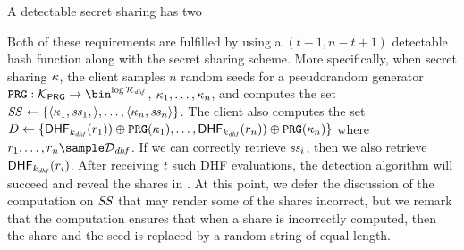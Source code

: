 \iffalse 
A detectable secret sharing has two

Both of these requirements are fulfilled by using a $(t-1, n - t + 1)$ detectable hash function along with the secret sharing scheme. More specifically, when secret sharing $\kappa$, the client samples $n$ random seeds for a pseudorandom generator $\prg: \prgKeySpace \rightarrow \bin^{\log \dhfRange}$,  
 $\kappa_1, \dots, \kappa_n$, and computes the set $\mathit{SS} \gets \{\langle \kappa_1, \mathit{ss}_{1}, \rangle, \dots, \langle \kappa_n, \mathit{ss}_{n} \rangle \}$. The client also computes the set $\dhfSet \assign \{\dhf[\dhfKey](\genericRand[1])) \oplus \prg(\genericSymmKey_1), \dots, \dhf[\dhfKey](\genericRand[n]))\oplus \prg(\genericSymmKey_n)\}$ where $\genericRand[1], \dots, \genericRand[n] \sample \dhfDomain$. If we can correctly retrieve $\mathit{ss}_{i}$, then we also retrieve $\dhf[\dhfKey](\genericRand[i])$. After receiving $t$ such DHF evaluations, the detection algorithm will succeed and reveal the shares in \ssSet. At this point, we defer the discussion of the computation on $\mathit{SS}$ that may render some of the shares incorrect, but we remark that the computation ensures that when a share is incorrectly computed, then the share and the seed is replaced by a random string of equal length.

